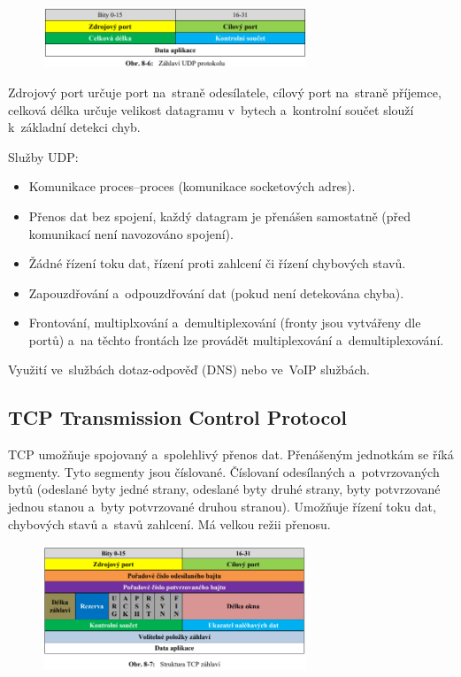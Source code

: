 \begin{figure}[!h]
    \centering
    \includegraphics[width=0.7\textwidth]{obrazky/030.png}
\end{figure}

Zdrojový port určuje port na~straně odesílatele, cílový port na~straně příjemce, celková délka určuje velikost datagramu v~bytech a~kontrolní součet slouží k~základní detekci chyb.

Služby UDP:
\begin{itemize}[noitemsep]
    \item Komunikace proces--proces (komunikace socketových adres).
    \item Přenos dat bez spojení, každý datagram je přenášen samostatně (před komunikací není navozováno spojení).
    \item Žádné řízení toku dat, řízení proti zahlcení či řízení chybových stavů.
    \item Zapouzdřování a~odpouzdřování dat (pokud není detekována chyba).
    \item Frontování, multiplxování a~demultiplexování (fronty jsou vytvářeny dle portů) a~na těchto frontách lze provádět multiplexování a~demultiplexování.
\end{itemize}

Využití ve~službách dotaz-odpověď (DNS) nebo ve~VoIP službách.

\subsection{TCP Transmission Control Protocol}

TCP umožňuje spojovaný a~spolehlivý přenos dat. Přenášeným jednotkám se říká segmenty. Tyto segmenty jsou číslované. Číslovaní odesílaných a~potvrzovaných bytů (odeslané byty jedné strany, odeslané byty druhé strany, byty potvrzované jednou stanou a~byty potvrzované druhou stranou). Umožňuje řízení toku dat, chybových stavů a~stavů zahlcení. Má velkou režii přenosu.

\begin{figure}[!h]
    \centering
    \includegraphics[width=0.7\textwidth]{obrazky/031.png}
\end{figure}

